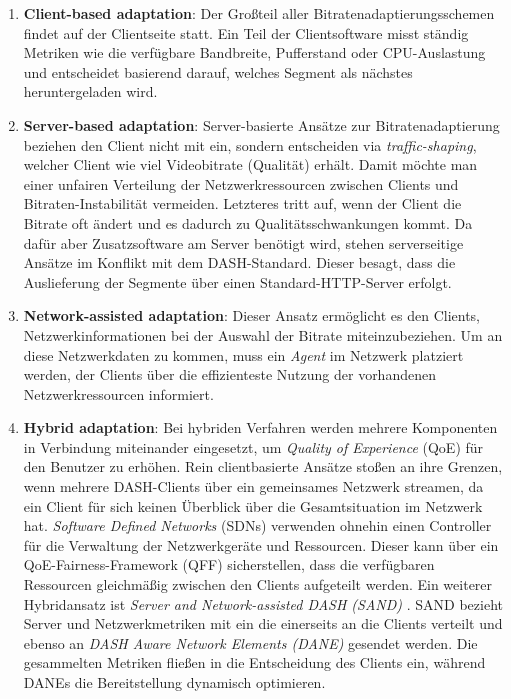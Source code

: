\documentclass[paper = a4, fontsize = 12pt, parskip = half]{scrartcl} %
\begin{document}
\begin{enumerate}
	\item \textbf{Client-based adaptation}: Der Großteil aller Bitratenadaptierungsschemen findet auf der Clientseite statt. Ein Teil der Clientsoftware misst ständig Metriken wie die verfügbare Bandbreite, Pufferstand oder CPU-Auslastung und entscheidet basierend darauf, welches Segment als nächstes heruntergeladen wird. 
	\item \textbf{Server-based adaptation}: Server-basierte Ansätze zur Bitratenadaptierung beziehen den Client nicht mit ein, sondern entscheiden via \textit{traffic-shaping}, welcher Client wie viel Videobitrate (Qualität) erhält. Damit möchte man einer unfairen Verteilung der Netzwerkressourcen zwischen Clients und Bitraten-Instabilität vermeiden. Letzteres tritt auf, wenn der Client die Bitrate oft ändert und es dadurch zu Qualitätsschwankungen kommt. Da dafür aber Zusatzsoftware am Server benötigt wird, stehen serverseitige Ansätze im Konflikt mit dem DASH-Standard. Dieser besagt, dass die Auslieferung der Segmente über einen Standard-HTTP-Server erfolgt.
	\item \textbf{Network-assisted adaptation}: Dieser Ansatz ermöglicht es den Clients, Netzwerkinformationen bei der Auswahl der Bitrate miteinzubeziehen. Um an diese Netzwerkdaten zu kommen, muss ein \textit{Agent} im Netzwerk platziert werden, der Clients über die effizienteste Nutzung der vorhandenen Netzwerkressourcen informiert.
	\item \textbf{Hybrid adaptation}: Bei hybriden Verfahren werden mehrere Komponenten in Verbindung miteinander eingesetzt, um \textit{Quality of Experience} (QoE) für den Benutzer zu erhöhen. Rein clientbasierte Ansätze stoßen an ihre Grenzen, wenn mehrere DASH-Clients über ein gemeinsames Netzwerk streamen, da ein Client für sich keinen Überblick über die Gesamtsituation im Netzwerk hat. \textit{Software Defined Networks} (SDNs) verwenden ohnehin einen Controller für die Verwaltung der Netzwerkgeräte und Ressourcen. Dieser kann über ein QoE-Fairness-Framework (QFF) sicherstellen, dass die verfügbaren Ressourcen gleichmäßig zwischen den Clients aufgeteilt werden. Ein weiterer Hybridansatz ist \textit{Server and Network-assisted DASH (SAND)} \cite{stockhhammer_sand}. SAND bezieht Server und Netzwerkmetriken mit ein die einerseits an die Clients verteilt und ebenso an \textit{DASH Aware Network Elements (DANE)} gesendet werden. Die gesammelten Metriken fließen in die Entscheidung des Clients ein, während DANEs die Bereitstellung dynamisch optimieren.
\end{enumerate}
\end{document}
